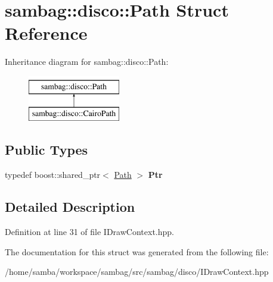 \hypertarget{structsambag_1_1disco_1_1_path}{
\section{sambag::disco::Path Struct Reference}
\label{structsambag_1_1disco_1_1_path}
}
Inheritance diagram for sambag::disco::Path:\begin{figure}[H]
\begin{center}
\leavevmode
\includegraphics[height=2.000000cm]{structsambag_1_1disco_1_1_path}
\end{center}
\end{figure}
\subsection*{Public Types}
\begin{DoxyCompactItemize}
\item 
\hypertarget{structsambag_1_1disco_1_1_path_af11e0e5de8630a092da4a2d1d7f10c24}{
typedef boost::shared\_\-ptr$<$ \hyperlink{structsambag_1_1disco_1_1_path}{Path} $>$ {\bfseries Ptr}}
\label{structsambag_1_1disco_1_1_path_af11e0e5de8630a092da4a2d1d7f10c24}

\end{DoxyCompactItemize}


\subsection{Detailed Description}


Definition at line 31 of file IDrawContext.hpp.



The documentation for this struct was generated from the following file:\begin{DoxyCompactItemize}
\item 
/home/samba/workspace/sambag/src/sambag/disco/IDrawContext.hpp\end{DoxyCompactItemize}

